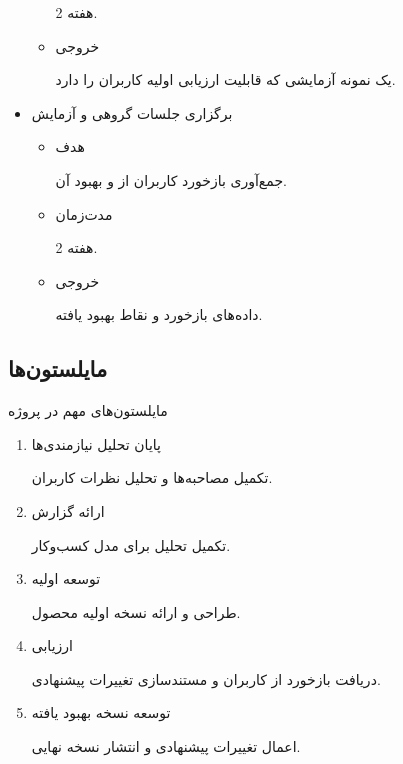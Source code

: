 \documentclass[dvipsnames, svgnames, x11names, 11pt]{article}
\begin{document}
\begin{itemize}
\begin{itemize}
2 هفته.

\item 
خروجی

یک نمونه آزمایشی که قابلیت ارزیابی اولیه کاربران را دارد.
\end{itemize}

\item 
برگزاری جلسات گروهی و آزمایش 
\begin{itemize}
\item 
هدف

جمع‌آوری بازخورد کاربران از  و بهبود آن.

\item 
مدت‌زمان

2 هفته.

\item 
خروجی

داده‌های بازخورد و نقاط بهبود یافته.
\end{itemize}
\end{itemize}

\subsection{مایلستون‌ها}
مایلستون‌های مهم در پروژه
\begin{enumerate}
\item 
پایان تحلیل نیازمندی‌ها

تکمیل مصاحبه‌ها و تحلیل نظرات کاربران.

\item 
ارائه گزارش 

تکمیل تحلیل  برای مدل کسب‌وکار.

\item 
توسعه اولیه 

طراحی و ارائه نسخه اولیه محصول.

\item 
ارزیابی 

دریافت بازخورد از کاربران و مستندسازی تغییرات پیشنهادی.

\item 
توسعه نسخه بهبود یافته

اعمال تغییرات پیشنهادی و انتشار نسخه نهایی.
\end{enumerate}
\end{document}
